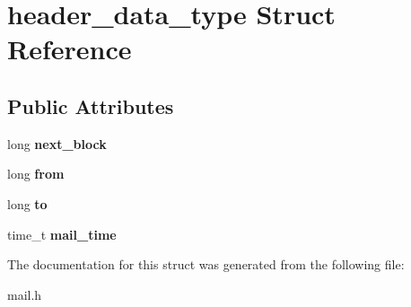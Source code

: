 \hypertarget{structheader__data__type}{}\section{header\+\_\+data\+\_\+type Struct Reference}
\label{structheader__data__type}
\subsection*{Public Attributes}
\begin{DoxyCompactItemize}
\item 
\mbox{\label{structheader__data__type_a183f5bac0117f77e2f664048208bac89}} 
long {\bfseries next\+\_\+block}
\item 
\mbox{\label{structheader__data__type_a140c7200ef8188f7e7d307d1c9f445de}} 
long {\bfseries from}
\item 
\mbox{\label{structheader__data__type_ae0b6cda4713d1e2ce4a3b9c00825b6f5}} 
long {\bfseries to}
\item 
\mbox{\label{structheader__data__type_ae2aaad49dcd3cf9e0b33704a4181a108}} 
time\+\_\+t {\bfseries mail\+\_\+time}
\end{DoxyCompactItemize}


The documentation for this struct was generated from the following file\+:\begin{DoxyCompactItemize}
\item 
mail.\+h\end{DoxyCompactItemize}
